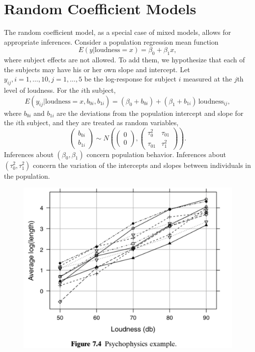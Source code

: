 \documentclass[14pt]{extarticle}
\begin{document}
\section*{Random Coefficient Models}
\noindent
The random coefficient model, as a special case of mixed models, allows for appropriate inferences. Consider a population regression mean function
\[
E(y | \text{loudness} = x) = \beta_0 + \beta_1 x,
\]
where subject effects are not allowed. To add them, we hypothesize that each of the subjects may have his or her own slope and intercept. Let \( y_{ij}, i = 1, \ldots, 10, j = 1, \ldots, 5 \) be the log-response for subject \( i \) measured at the \( j \)th level of loudness.
For the \( i \)th subject,
\[
E(y_{ij} | \text{loudness} = x, b_{0i}, b_{1i}) = (\beta_0 + b_{0i}) + (\beta_1 + b_{1i}) \, \text{loudness}_{ij},
\]
where \( b_{0i} \) and \( b_{1i} \) are the deviations from the population intercept and slope for the \( i \)th subject, and they are treated as random variables,
\[
\begin{pmatrix} b_{0i} \\ b_{1i} \end{pmatrix} \sim N \left( \begin{pmatrix} 0 \\ 0 \end{pmatrix}, \begin{pmatrix} \tau_0^2 & \tau_{01} \\ \tau_{01} & \tau_1^2 \end{pmatrix} \right).
\]
Inferences about \( (\beta_0, \beta_1) \) concern population behavior. Inferences about \( (\tau_0^2, \tau_1^2) \) concern the variation of the intercepts and slopes between individuals in the population.
\begin{figure}[H]
    \centering
    \includegraphics[width=1\textwidth]{fig12.png}
\end{figure} 
\end{document}
